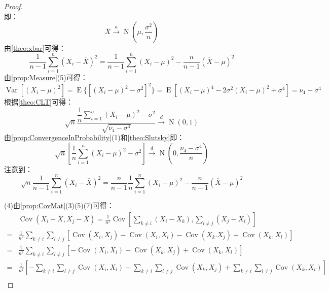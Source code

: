 \begin{proof}
\begin{equation*}
	\end{equation*}
	即：
	\begin{equation*}
		\overline{X}\overset{a}{\longrightarrow}\operatorname{N}\left(\mu,\frac{\sigma^2}{n}\right)
	\end{equation*}
	由\cref{theo:xbar}可得：
	\begin{equation*}
		\frac{1}{n-1}\sum_{i=1}^{n}(X_i-\overline{X})^2=\frac{1}{n-1}\sum_{i=1}^{n}(X_i-\mu)^2-\frac{n}{n-1}(\overline{X}-\mu)^2
	\end{equation*}
	由\cref{prop:Measure}(5)可得：
	\begin{equation*}
		\operatorname{Var}[(X_i-\mu)^2]=\operatorname{E}\{[(X_i-\mu)^2-\sigma^2]^2\}=\operatorname{E}[(X_i-\mu)^4-2\sigma^2(X_i-\mu)^2+\sigma^4]=\nu_4-\sigma^4
	\end{equation*}
	根据\cref{theo:CLT}可得：
	\begin{equation*}
		\sqrt{n}\frac{\dfrac{1}{n}\sum\limits_{i=1}^{n}(X_i-\mu)^2-\sigma^2}{\sqrt{\nu_4-\sigma^4}}\overset{d}{\longrightarrow}\operatorname{N}(0,1)
	\end{equation*}
	由\cref{prop:ConvergenceInProbability}(1)和\cref{theo:Slutsky}即：
	\begin{equation*}
		\sqrt{n}\left[\frac{1}{n}\sum_{i=1}^{n}(X_i-\mu)^2-\sigma^2\right]\overset{d}{\longrightarrow}\operatorname{N}\left(0,\frac{\nu_4-\sigma^4}{n}\right)
	\end{equation*}
	注意到：
	\begin{equation*}
		\sqrt{n}\frac{1}{n-1}\sum_{i=1}^{n}(X_i-\overline{X})^2=\frac{n}{n-1}\frac{1}{n}\sum_{i=1}^{n}(X_i-\mu)^2-\frac{n}{n-1}(\overline{X}-\mu)^2
	\end{equation*}\par
	(4)由\cref{prop:CovMat}(3)(5)(7)可得：
	\begin{align*}
		&\operatorname{Cov}(X_i-\overline{X},X_j-\overline{X})=\frac{1}{n^2}\operatorname{Cov}\left[\sum_{k\ne i}^{}(X_i-X_k),\sum_{l\ne j}^{}(X_j-X_l)\right] \\
		=&\frac{1}{n^2}\sum_{k\ne i}^{}\sum_{l\ne j}^{}[\operatorname{Cov}(X_i,X_j)-\operatorname{Cov}(X_i,X_l)-\operatorname{Cov}(X_k.X_j)+\operatorname{Cov}(X_k,X_l)] \\
		=&\frac{1}{n^2}\sum_{k\ne i}^{}\sum_{l\ne j}^{}[-\operatorname{Cov}(X_i,X_l)-\operatorname{Cov}(X_k,X_j)+\operatorname{Cov}(X_k,X_l)] \\
		=&\frac{1}{n^2}\left[-\sum_{k\ne i}^{}\sum_{l\ne j}^{}\operatorname{Cov}(X_i,X_l)-\sum_{k\ne i}^{}\sum_{l\ne j}^{}\operatorname{Cov}(X_k,X_j)+\sum_{k\ne i}^{}\sum_{l\ne j}^{}\operatorname{Cov}(X_k,X_l)\right] \\

\end{align*}
\end{proof}
